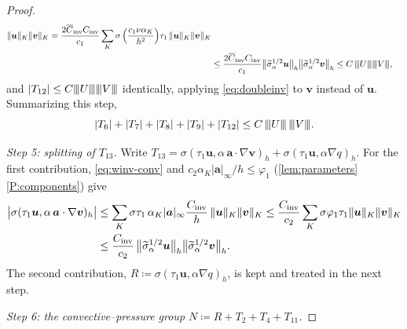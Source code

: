 \documentclass[11pt,a4paper]{article}
\newcommand{\bu}{\boldsymbol{u}}
\newcommand{\bv}{\boldsymbol{v}}
\newcommand{\ba}{\boldsymbol{a}}
\newcommand{\Cinv}{C_{\mathrm{inv}}}
\newcommand{\Cinva}{\overline{C}_{\mathrm{inv}}}
\DeclarePairedDelimiter{\norm}{\lVert}{\rVert}
\newcommand{\triplenorm}[1]{{\lvert\kern-0.25ex\lvert\kern-0.25ex\lvert #1
\rvert\kern-0.25ex\rvert\kern-0.25ex\rvert}}
\newcommand{\sigmatilde}{\widetilde{\sigma}_{\alpha}}
\theoremstyle{plain}
\theoremstyle{remark}
\theoremstyle{definition}
\numberwithin{equation}{section}
\begin{document}
\begin{proof}
\begin{align}
  \norm{\bu}_K\norm{\bv}_K
  = \frac{2\Cinva\Cinv}{c_1}\sum_{K}
  \sigma\,\Bigl(\frac{c_1\nu\alpha_K}{h^2}\Bigr)\tau_1\,\norm{\bu}_K\norm{\bv}_K
  \nonumber\\
  &\le \frac{2\Cinva\Cinv}{c_1}
  \bigl\lVert\sigmatilde^{1/2}\bu\bigr\rVert_h
  \bigl\lVert\sigmatilde^{1/2}\bv\bigr\rVert_h
  \le C\,\triplenorm{U}\triplenorm{V},
  \label{eq:T8bound}
\end{align}
and $|T_{12}|\le C\triplenorm{U}\triplenorm{V}$ identically, applying
\eqref{eq:doubleinv} to $\bv$ instead of $\bu$. Summarizing this step,
\begin{equation}\label{eq:viscstep}
  |T_6|+|T_7|+|T_8|+|T_9|+|T_{12}| \le C\,\triplenorm{U}\,\triplenorm{V}.
\end{equation}

\medskip\noindent\emph{Step 5: splitting of $T_{13}$.}
Write $T_{13}=\sigma(\tau_1\bu,\alpha\,\ba\cdot\nabla\bv)_h
+\sigma(\tau_1\bu,\alpha\nabla q)_h$. For the first contribution,
\eqref{eq:winv-conv} and $c_2\alpha_K|\ba|_\infty/h\le\varphi_1$
(\cref{lem:parameters}\ref{P:components}) give
\begin{align}
  \bigl|\sigma(\tau_1\bu,\alpha\,\ba\cdot\nabla\bv)_h\bigr|
  &\le \sum_K \sigma\tau_1\,\alpha_K|\ba|_{\infty}\frac{\Cinv}{h}\,
  \norm{\bu}_K\norm{\bv}_K
  \le \frac{\Cinv}{c_2}\sum_K \sigma\varphi_1\tau_1\norm{\bu}_K\norm{\bv}_K
  \nonumber\\
  &\le \frac{\Cinv}{c_2}\,
  \bigl\lVert\sigmatilde^{1/2}\bu\bigr\rVert_h
  \bigl\lVert\sigmatilde^{1/2}\bv\bigr\rVert_h .
  \label{eq:T13conv}
\end{align}
The second contribution, $R\coloneqq\sigma(\tau_1\bu,\alpha\nabla q)_h$, is kept and
treated in the next step.

\medskip\noindent\emph{Step 6: the convective--pressure group
$N\coloneqq R+T_2+T_4+T_{11}$.}


\end{proof}
\end{document}
